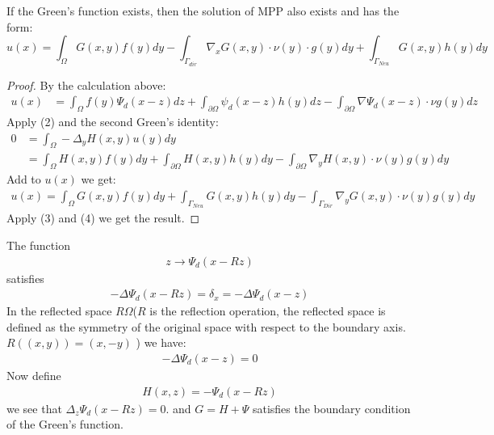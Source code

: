 \begin{theorem}
	If the Green's function exists, then the solution of MPP also exists and has the form:
	\begin{equation}\label{PE: Green's formula}
		u(x) = \int_\Omega G(x, y)f(y)dy - \int_{\Gamma_{dir}}\nabla_x G(x, y)\cdot \nu(y) \cdot  g(y) dy + \int_{\Gamma_{Neu}} G(x,y) h(y)dy
	\end{equation}
\end{theorem}
\begin{proof}
	By the calculation above:
	\begin{align*}
		u(x) &= \int_\Omega f(y) \Psi_d(x-z)dz 
		+ \int_{\partial \Omega} \psi_d(x-z)h(y) dz 
		- \int_{\partial \Omega}\nabla\Psi_d(x-z) \cdot \nu g(y) dz
	\end{align*}
	Apply (2) and the second Green's identity:
	\begin{align*}
		0 &= \int_{\Omega} -\Delta_y H(x, y) u(y) dy \\
		&= \int_{\Omega} H(x, y) f(y) dy 
		  + \int_{\partial \Omega} H(x, y) h(y) dy
		  - \int_{\partial \Omega} \nabla_y H(x, y) \cdot \nu(y) g(y) dy
	\end{align*}
	Add to $u(x)$ we get:
	\begin{align*}
		u(x) = \int_{\Omega} G(x, y) f(y)dy
				+\int_{\Gamma_{Neu}} G(x,y)h(y)dy
				 - \int_{\Gamma_{Dir}}\nabla_y G(x, y)\cdot \nu(y) g(y)dy
	\end{align*}
	Apply (3) and (4) we get the result.
\end{proof}

\begin{example}
	The function 
	\begin{align*}
		z \rightarrow \Psi_d(x - Rz)
	\end{align*}
	satisfies
	\begin{align*}
		-\Delta \Psi_d (x -Rz) = \delta_x = -\Delta \Psi_d(x -z)
	\end{align*}
	In the reflected space $R\Omega$($R$ is the reflection operation, the reflected space is defined as the symmetry of the original space with respect to the boundary axis. $R((x, y)) = (x, -y)$ ) we have:
	\begin{align*}
		-\Delta \Psi_d(x - z) = 0
	\end{align*}
	Now define
	\begin{align*}
		H(x, z) = -\Psi_d(x - Rz)
	\end{align*}
	we see that $\Delta_z \Psi_d(x - Rz) = 0$. and $G = H +\Psi$ satisfies the boundary condition of the Green's function. 
\end{example}




